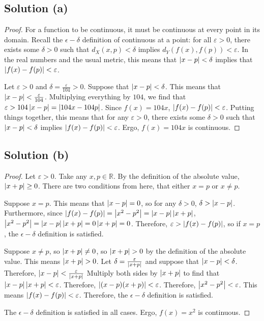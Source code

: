 \documentclass[11pt]{article}
\begin{document}
    \subsection{Solution (a)}
        \begin{proof}
            For a function to be continuous, it must be continuous at every point in its domain.
            Recall the $\epsilon-\delta$ definition of continuous at a point: for all $\varepsilon > 0$, there exists some $\delta > 0$ such that $d_X(x,p) < \delta$ implies $d_Y(f(x),f(p)) < \varepsilon$.
            In the real numbers and the usual metric, this means that $\left| x - p \right| < \delta$ implies that $\left| f(x) - f(p) \right| < \varepsilon$.

            Let $\varepsilon > 0$ and $\delta = \frac{\varepsilon}{104} > 0$.
            Suppose that $\left| x - p \right| < \delta$.
            This means that $\left| x - p \right| < \frac{\varepsilon}{104}$.
            Multiplying everything by $104$, we find that $\varepsilon > 104 \left| x - p \right| = \left| 104x - 104p \right|$.
            Since $f(x) = 104x$, $\left| f(x) - f(p) \right| < \varepsilon$.
            Putting things together, this means that for any $\varepsilon > 0$, there exists some $\delta > 0$ such that $\left| x - p \right| < \delta$ implies $\left| f(x) - f(p) \right| < \varepsilon$.
            Ergo, $f(x) = 104x$ is continuous.
        \end{proof}

    \subsection{Solution (b)}
        \begin{proof}
            Let $\varepsilon > 0$.
            Take any $x, p \in \mathbb{R}$.
            By the definition of the absolute value, $\left| x + p \right| \geq 0$.
            There are two conditions from here, that either $x = p$ or $x \neq p$.

            Suppose $x = p$.
            This means that $\left| x - p \right| = 0$, so for any $\delta > 0$, $\delta > \left| x - p \right|$.
            Furthermore, since $\left| f(x) - f(p) \right| = \left| x^2 - p^2 \right| = \left| x - p \right| \left| x + p \right|$, $\left| x^2 - p^2 \right| = \left| x - p \right| \left| x + p \right| = 0 \left| x + p \right| = 0$.
            Therefore, $\varepsilon > \left| f(x) - f(p) \right|$, so if $x = p$, the $\epsilon-\delta$ definition is satisfied.

            Suppose $x \neq p$, so $\left| x + p \right| \neq 0$, so $\left| x + p \right| > 0$ by the definition of the absolute value.
            This means $\left| x + p \right| > 0$.
            Let $\delta = \frac{\varepsilon}{\left| x + p \right|}$ and suppose that $\left| x - p \right| < \delta$.
            Therefore, $\left| x - p \right| < \frac{\varepsilon}{\left| x + p \right|}$
            Multiply both sides by $\left| x + p \right|$ to find that $\left| x - p \right| \left| x + p \right| < \varepsilon$.
            Therefore, $\left| (x - p)(x + p) \right| < \varepsilon$.
            Therefore, $\left| x^2 - p^2 \right| < \varepsilon$.
            This means $\left| f(x) - f(p) \right| < \varepsilon$.
            Therefore, the $\epsilon-\delta$ definition is satisfied.

            The $\epsilon-\delta$ definition is satisfied in all cases.
            Ergo, $f(x) = x^2$ is continuous.
        \end{proof}
\end{document}
